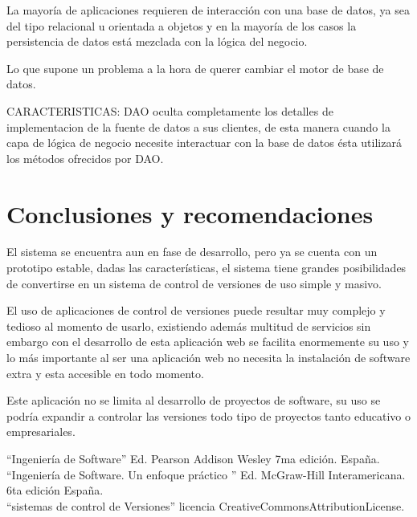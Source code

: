 \documentclass[letterpaper,11pt]{article}
\begin{document}
\begin{itemize}
La mayoría de aplicaciones requieren de interacción con una base de datos, ya sea del tipo relacional u orientada a objetos y en la mayoría de los casos la persistencia de datos está mezclada con la lógica del negocio.

Lo que supone un problema a la hora de querer cambiar el motor de base de datos.

CARACTERISTICAS: DAO oculta completamente los detalles de implementacion de la fuente de datos a sus clientes, de esta manera cuando la capa de lógica de negocio necesite interactuar con la base de datos ésta utilizará los
métodos ofrecidos por DAO.

\end{itemize}
\section{Conclusiones y recomendaciones}
El sistema se encuentra aun en fase de desarrollo, pero ya se cuenta con un prototipo estable, dadas las características, el sistema tiene grandes posibilidades de convertirse en un sistema de control de versiones de uso simple y masivo.

El uso de aplicaciones de control de versiones puede resultar muy complejo y tedioso  al momento de usarlo, existiendo además multitud de servicios sin embargo  con el desarrollo de esta aplicación web se facilita enormemente  su uso  y lo más importante al ser una aplicación web no necesita la instalación de software extra y esta accesible en todo momento.  

Este aplicación no se limita  al desarrollo de proyectos de software, su uso  se podría expandir a controlar las versiones todo  tipo de proyectos tanto educativo o empresariales.

\begin{thebibliography}{99}

“Ingeniería de Software” Ed. Pearson Addison Wesley 7ma edición. España.\\
“Ingeniería de Software. Un enfoque práctico ” Ed. McGraw-Hill Interamericana. 6ta edición España. \\
 “sistemas de control de Versiones” licencia CreativeCommonsAttributionLicense.\\

\end{thebibliography}
\end{document}
